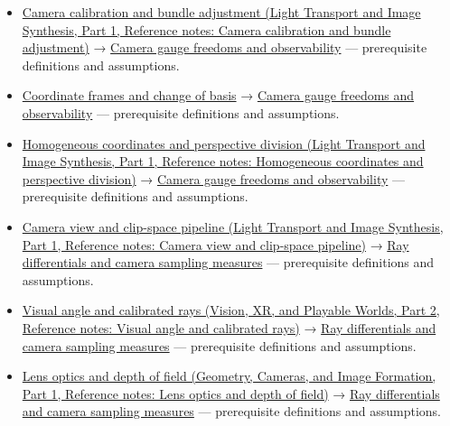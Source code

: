 \begin{itemize}
\tightlist
\item
  \href{../04-Light-Transport-and-Image-Synthesis-P01/main.pdf\#appendix-3ee9861904d5}{Camera calibration and bundle adjustment (Light Transport and Image Synthesis, Part 1, Reference notes: Camera calibration and bundle adjustment)} → \hyperref[appendix-113f0267e5f4]{Camera gauge freedoms and observability} --- prerequisite definitions and assumptions.
\item
  \hyperref[appendix-1bae9457dbc3]{Coordinate frames and change of basis} → \hyperref[appendix-113f0267e5f4]{Camera gauge freedoms and observability} --- prerequisite definitions and assumptions.
\item
  \href{../04-Light-Transport-and-Image-Synthesis-P01/main.pdf\#appendix-cb3b26862282}{Homogeneous coordinates and perspective division (Light Transport and Image Synthesis, Part 1, Reference notes: Homogeneous coordinates and perspective division)} → \hyperref[appendix-113f0267e5f4]{Camera gauge freedoms and observability} --- prerequisite definitions and assumptions.
\item
  \href{../04-Light-Transport-and-Image-Synthesis-P01/main.pdf\#appendix-1c07d64f5e70}{Camera view and clip-space pipeline (Light Transport and Image Synthesis, Part 1, Reference notes: Camera view and clip-space pipeline)} → \hyperref[appendix-8c40fad29462]{Ray differentials and camera sampling measures} --- prerequisite definitions and assumptions.
\item
  \href{../07-Vision-XR-and-Playable-Worlds-P02/main.pdf\#appendix-7d356c396d1a}{Visual angle and calibrated rays (Vision, XR, and Playable Worlds, Part 2, Reference notes: Visual angle and calibrated rays)} → \hyperref[appendix-8c40fad29462]{Ray differentials and camera sampling measures} --- prerequisite definitions and assumptions.
\item
  \href{../03-Geometry-Cameras-and-Image-Formation-P01/main.pdf\#appendix-21f8456e2629}{Lens optics and depth of field (Geometry, Cameras, and Image Formation, Part 1, Reference notes: Lens optics and depth of field)} → \hyperref[appendix-8c40fad29462]{Ray differentials and camera sampling measures} --- prerequisite definitions and assumptions.
\end{itemize}
